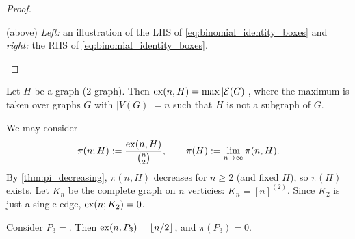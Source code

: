 \begin{proof}
\begin{marginfigure}[0\baselineskip]
\begin{center}
\end{center}
\caption{(above) \emph{Left:} an illustration of the LHS of \cref{eq:binomial_identity_boxes} and \emph{right:} the RHS of \cref{eq:binomial_identity_boxes}. } \label{fig:binomial_identity_boxes}
\end{marginfigure}
\end{proof}

Let $H$ be a graph ($2$-graph). Then $\operatorname{ex}(n,H)=\max |\mathcal{E} (G)|$, where the maximum is taken over graphs $G$ with $|V(G)| = n$ such that $H$ is not a subgraph of $G$.

We may consider
\[	
\pi(n;H) := \frac{\operatorname{ex}(n,H)}{{n\choose 2}}, \qquad \pi(H):= \lim_{n\to \infty}\pi(n,H).
\]
By \cref{thm:pi_decreasing}, $\pi(n,H)$ decreases for $n\geq 2$ (and fixed $H$), so $\pi(H)$ exists. Let $K_n$ be the complete graph on $n$ verticies: $K_n = [n]^{(2)}$. Since $K_2$ is just a single edge, $\operatorname{ex}(n; K_2)=0$.

Consider
$P_3 =$. Then $\operatorname{ex}(n,P_3) = \lfloor n/2\rfloor$, and $\pi(P_3)=0$.

